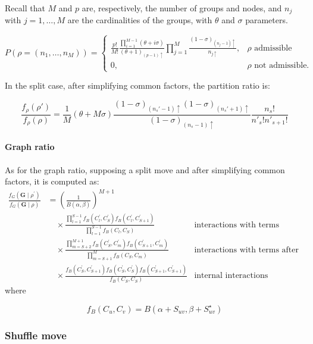 Recall that $M$ and $p$ are, respectively, the number of groups and nodes, and $n_{j}$ with $j=1,\ldots,M$ are the cardinalities of the groups, with $\theta$ and $\sigma$ parameters.

    $$P(\rho = (n_1, \ldots, n_M))
    =
    \begin{cases}
        \frac{p!}{M!} \frac{ \prod_{i=1}^{M-1}{(\theta +i\sigma)} }{(\theta+1)_{(p-1)\uparrow}} \prod_{j=1}^{M}{\frac{(1-\sigma)_{(n_{j}-1)\uparrow}}{n_{j\uparrow}} }, & \rho \text{ admissible}\\
                0, & \rho \text{ not admissible.}
    \end{cases}
$$

In the split case, after simplifying common factors, the partition ratio is:

\begin{equation*}
    \frac{f_{\rho}(\rho')}{f_{\rho}(\rho)}
    =
    \frac{1}{M}(\theta+M\sigma)\frac{(1-\sigma)_{(n_{s}'-1)\uparrow}(1-\sigma)_{(n_{s}'+1)\uparrow}}{(1-\sigma)_{(n_{s}-1)\uparrow}}\frac{n_{s}!}{n'_{s}!n'_{s+1}!}
\end{equation*}
\paragraph{Graph ratio}
As for the graph ratio, supposing a split move and after simplifying common factors, it is computed as:
\begin{align*}
    \frac{f_G(\bm{G} \mid \rho^\prime)}{f_G(\bm{G} \mid \rho)}
    & =\left(\frac{1}{B(\alpha, \beta)}\right)^{M+1} &  \\
    & \quad \times \frac{\prod_{l=1}^{S-1} f_B(C_l^\prime, C_S^\prime) f_B(C_l^\prime, C_{S+1}^\prime)}{\prod_{l=1}^{S-1} f_B(C_l, C_S)} & \text{interactions with terms before}\\
    & \quad \times \frac{\prod_{m=S+2}^{M+1} f_B(C_S^\prime, C_m^\prime) f_B(C_{S+1}^\prime, C_m^\prime)}{\prod_{m=S+1}^M f_B(C_S, C_m)} & \text{interactions with terms after}\\
    & \quad \times \frac{f_B(C_S^\prime, C_{S+1}^\prime) f_B(C_S^\prime, C_S^\prime) f_B(C_{S+1}^\prime, C_{S+1}^\prime)}{f_B(C_S, C_S)} & \text{internal interactions}
\end{align*}
where

\[
    f_B(C_u, C_v) = B(\alpha+S_{uv},\beta+S^{\star}_{uv})
\]

\subsubsection{Shuffle move}

